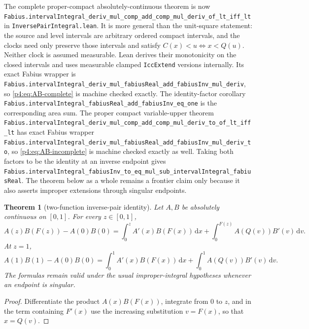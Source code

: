 \documentclass[11pt,oneside]{article}
\newtheorem{theorem}{Theorem}[section]
\theoremstyle{definition}
\theoremstyle{remark}
\newcommand{\F}{F}
\newcommand{\Q}{Q}
\newcommand{\dd}{\,\mathrm d}
\newcommand{\1}{\mathbf 1}
\begin{document}
\begin{statusbox}
The complete proper-compact absolutely-continuous theorem is now
\nolinkurl{Fabius.intervalIntegral_deriv_mul_comp_add_comp_mul_deriv_of_lt_iff_lt}
in \texttt{InversePairIntegral.lean}.  It is more general than the unit-square statement:
the source and level intervals are arbitrary ordered compact intervals, and the clocks
need only preserve those intervals and satisfy
\(C(x)<u\Longleftrightarrow x<Q(u)\).  Neither clock is assumed measurable.  Lean derives
their monotonicity on the closed intervals and uses measurable clamped
\texttt{IccExtend} versions internally.  Its exact Fabius wrapper is
\nolinkurl{Fabius.intervalIntegral_deriv_mul_fabiusReal_add_fabiusInv_mul_deriv},
so \cref{p4:eq:AB-complete} is machine checked exactly.  The identity-factor corollary
\nolinkurl{Fabius.intervalIntegral_fabiusReal_add_fabiusInv_eq_one} is the corresponding
area sum.  The proper compact variable-upper theorem
\nolinkurl{Fabius.intervalIntegral_deriv_mul_comp_add_comp_mul_deriv_to_of_lt_iff_lt}
has exact Fabius wrapper
\nolinkurl{Fabius.intervalIntegral_deriv_mul_fabiusReal_add_fabiusInv_mul_deriv_to},
so \cref{p4:eq:AB-incomplete} is machine checked exactly as well.  Taking both factors to
be the identity at an inverse endpoint gives
\nolinkurl{Fabius.intervalIntegral_fabiusInv_to_eq_mul_sub_intervalIntegral_fabiusReal}.
The theorem below as a whole remains a frontier claim only because it also asserts
improper extensions through singular endpoints.
\end{statusbox}

\begin{theorem}[two-function inverse-pair identity]\label{p4:thm:AB}
Let \(A,B\) be absolutely continuous on \([0,1]\).  For every \(z\in[0,1]\),
\begin{equation}\label{p4:eq:AB-incomplete}
 A(z)B(\F(z))-A(0)B(0)
 =\int_0^z A'(x)B(\F(x))\dd x
 +\int_0^{\F(z)}A(\Q(v))B'(v)\dd v.
\end{equation}
At \(z=1\),
\begin{equation}\label{p4:eq:AB-complete}
 A(1)B(1)-A(0)B(0)
 =\int_0^1A'(x)B(\F(x))\dd x
 +\int_0^1A(\Q(v))B'(v)\dd v.
\end{equation}
The formulas remain valid under the usual improper-integral hypotheses whenever an
endpoint is singular.
\end{theorem}

\begin{proof}
Differentiate the product \(A(x)B(\F(x))\), integrate from \(0\) to \(z\), and in
the term containing \(\F'(x)\) use the increasing substitution \(v=\F(x)\),
so that \(x=\Q(v)\).
\end{proof}
\end{document}
